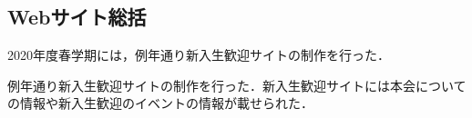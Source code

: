 \subsection*{Webサイト総括}


2020年度春学期には，例年通り新入生歓迎サイトの制作を行った．

例年通り新入生歓迎サイトの制作を行った．新入生歓迎サイトには本会についての情報や新入生歓迎のイベントの情報が載せられた．
